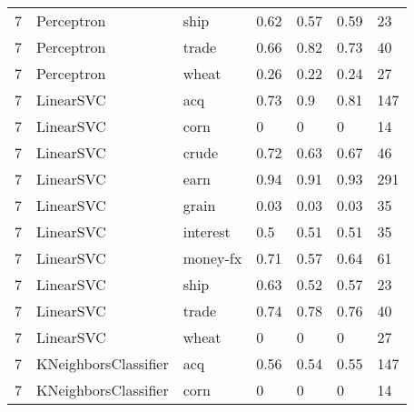 \documentclass{article}
\begin{document}
\begin{table}[h]
\begin{tabular}{lllllll}
7             & Perceptron             & ship            & 0.62               & 0.57            & 0.59              & 23               \\
7             & Perceptron             & trade           & 0.66               & 0.82            & 0.73              & 40               \\
7             & Perceptron             & wheat           & 0.26               & 0.22            & 0.24              & 27               \\
7             & LinearSVC              & acq             & 0.73               & 0.9             & 0.81              & 147              \\
7             & LinearSVC              & corn            & 0                  & 0               & 0                 & 14               \\
7             & LinearSVC              & crude           & 0.72               & 0.63            & 0.67              & 46               \\
7             & LinearSVC              & earn            & 0.94               & 0.91            & 0.93              & 291              \\
7             & LinearSVC              & grain           & 0.03               & 0.03            & 0.03              & 35               \\
7             & LinearSVC              & interest        & 0.5                & 0.51            & 0.51              & 35               \\
7             & LinearSVC              & money-fx        & 0.71               & 0.57            & 0.64              & 61               \\
7             & LinearSVC              & ship            & 0.63               & 0.52            & 0.57              & 23               \\
7             & LinearSVC              & trade           & 0.74               & 0.78            & 0.76              & 40               \\
7             & LinearSVC              & wheat           & 0                  & 0               & 0                 & 27               \\
7             & KNeighborsClassifier   & acq             & 0.56               & 0.54            & 0.55              & 147              \\
7             & KNeighborsClassifier   & corn            & 0                  & 0               & 0                 & 14               \\

\end{tabular}
\end{table}
\end{document}
